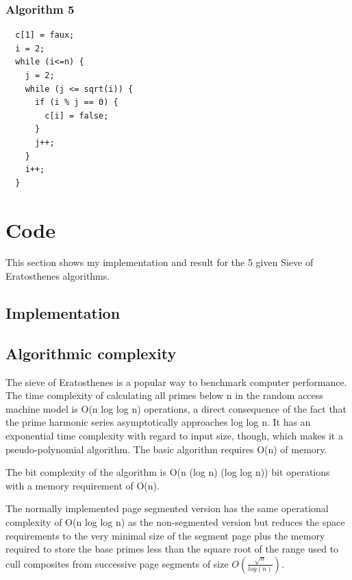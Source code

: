 \documentclass[a4paper, 12pt]{article}
\begin{document}
\newpage
\subsubsection{Algorithm 5}

\begin{lstlisting}
  c[1] = faux;
  i = 2;
  while (i<=n) {
    j = 2;
    while (j <= sqrt(i)) {
      if (i % j == 0) {
        c[i] = false;
      }
      j++;
    }
    i++;
  }
\end{lstlisting}

\newpage

\section{Code}

This section shows my implementation and result for the 5 given Sieve of Eratosthenes algorithms.

\subsection{Implementation}



\newpage

\subsection{Algorithmic complexity}

The sieve of Eratosthenes is a popular way to benchmark computer 
performance. The time complexity of calculating all primes below 
n in the random access machine model is O(n log log n) operations, 
a direct consequence of the fact that the prime harmonic series 
asymptotically approaches log log n. It has an exponential time 
complexity with regard to input size, though, which makes it a 
pseudo-polynomial algorithm. The basic algorithm requires O(n) of memory.

The bit complexity of the algorithm is O(n (log n) (log log n)) 
bit operations with a memory requirement of O(n).

The normally implemented page segmented version has the same operational 
complexity of O(n log log n) as the non-segmented version but reduces the 
space requirements to the very minimal size of the segment page plus the 
memory required to store the base primes less than the square root of the 
range used to cull composites from successive page segments of size $O(\frac{\sqrt{n}}{log(n)})$.
\end{document}
